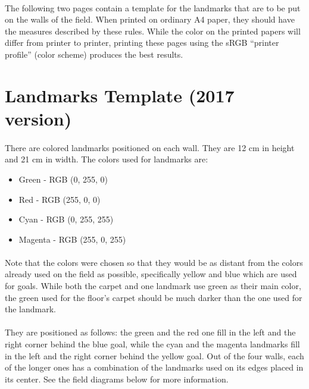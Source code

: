 \documentclass{article}
\newcommand*{\p}{\paragraph{}}
\begin{document}
\p The following two pages contain a template for the landmarks that are to be
put on the walls of the field. When printed on ordinary A4 paper, they should
have the measures described by these rules. While the color on the printed
papers will differ from printer to printer, printing these pages using the sRGB
``printer profile'' (color scheme) produces the best results.




\section{Landmarks Template (2017 version)\label{ref-066}}

\p There are colored landmarks positioned on each wall. They are 12 cm in height
and 21 cm in width. The colors used for landmarks are:

\begin{itemize}
\item Green - RGB (0, 255, 0)

\item Red - RGB (255, 0, 0)

\item Cyan - RGB (0, 255, 255)

\item Magenta - RGB (255, 0, 255)

\end{itemize}

\p Note that the colors were chosen so that they would be as distant from the
colors already used on the field as possible, specifically yellow and blue
which are used for goals. While both the carpet and one landmark use green as
their main color, the green used for the floor's carpet should be much darker
than the one used for the landmark.

\p They are positioned as follows: the green and the red one fill in the left and
the right corner behind the blue goal, while the cyan and the magenta landmarks
fill in the left and the right corner behind the yellow goal. Out of the four
walls, each of the longer ones has a combination of the landmarks used on its
edges placed in its center. See the field diagrams below for more
information.
\end{document}

